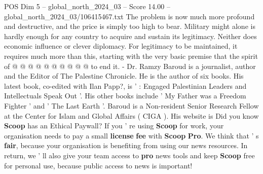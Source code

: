 \begin{textsample}{POS Dim 5 – global\_north\_2024\_03 – Score 14.00 – global\_north\_2024\_03/106415467.txt}
The problem is now much more profound and destructive, and the price is simply too high to bear.
Military might alone is hardly enough for any country to acquire and sustain its legitimacy.
Neither does economic influence or clever diplomacy.
For legitimacy to be maintained, it requires much more than this, starting with the very basic premise that the spirit of @ @ @ @ @ @ @ @ @ @ to end it. - Dr.
Ramzy Baroud is a journalist, author and the Editor of The Palestine Chronicle.
He is the author of six books.
His latest book, co-edited with Ilan Papp?, is ' : Engaged Palestinian Leaders and Intellectuals Speak Out '.
His other books include ' My Father was a Freedom Fighter ' and ' The Last Earth '.
Baroud is a Non-resident Senior Research Fellow at the Center for Islam and Global Affairs ( CIGA ).
His website is Did you know \textbf{Scoop} has an Ethical Paywall?
If you ' re using \textbf{Scoop} for work, your organisation needs to pay a small \textbf{license} \textbf{fee} with \textbf{Scoop} \textbf{Pro}.
We think that ' s \textbf{fair}, because your organisation is benefiting from using our news resources.
In return, we ' ll also give your team access to \textbf{pro} news tools and keep \textbf{Scoop} free for personal use, because public access to news is important!

\end{textsample}

